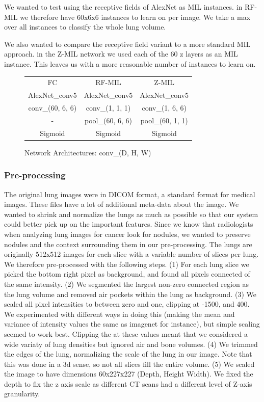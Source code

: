 \documentclass[twocolumn,10pt]{article}
\begin{document}
We wanted to test using the receptive fields of AlexNet as MIL instances. in RF-MIL we therefore have 60x6x6 instances to learn on per image. We take a max over all instances to classify the whole lung volume.

We also wanted to compare the receptive field variant to a more standard MIL approach. in the Z-MIL network we used each of the 60 z layers as an MIL instance. This leaves us with a more reasonable number of instances to learn on.  

\begin{figure}[H]
  \label{fig:architecture}
  \begin{center}
    \begin{tabular}{ | c |c| c| }
    \hline
     FC & RF-MIL & Z-MIL\\
    \hhline{|=|=|=|}
    AlexNet\_conv5 & AlexNet\_conv5  & AlexNet\_conv5 \\
    \hline
    {conv\_(60, 6, 6)} & conv\_(1, 1, 1)  & conv\_(1, 6, 6)   \\
    \hline
    - & pool\_(60, 6, 6) & pool\_(60, 1, 1) \\
    \hline
    Sigmoid & Sigmoid & Sigmoid \\
    \hline
    \end{tabular}   
  \end{center}
  \caption{Network Architectures: conv\_(D, H, W) }
\end{figure}

\subsubsection{Pre-processing}{}

The original lung images were in DICOM format, a standard format for medical images. These files have a lot of additional meta-data about the image. We wanted to shrink and normalize the lungs as much as possible so that our system could better pick up on the important features. Since we know that radiologists when analyzing lung images for cancer look for nodules, we wanted to preserve nodules and the context surrounding them in our pre-processing. The lungs are originally 512x512 images for each slice with a variable number of slices per lung. We therefore pre-processed with the following steps. (1) For each lung slice we picked the bottom right pixel as background, and found all pixels connected of the same intensity. (2) We segmented the largest non-zero connected region as the lung volume and removed air pockets within the lung as background. (3) We scaled all pixel intensities to between zero and one, clipping at -1500, and 400. We experimented with different ways in doing this (making the mean and variance of intensity values the same as imagenet for instance), but simple scaling seemed to work best. Clipping the at these values meant that we considered a wide variaty of lung densities but ignored air and bone volumes. (4) We trimmed the edges of the lung, normalizing the scale of the lung in our image. Note that this was done in a 3d sense, so not all slices fill the entire volume. (5) We scaled the image to have dimensions 60x227x227 (Depth, Height Width). We fixed the depth to fix the z axis scale as different CT scans had a different level of Z-axis granularity.
\end{document}
